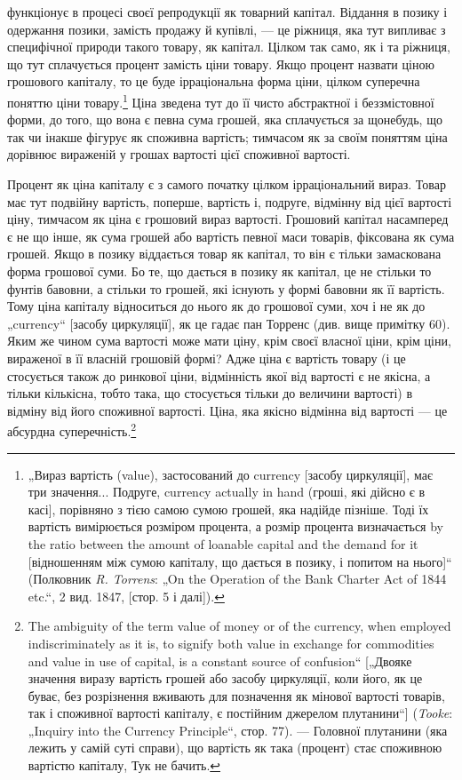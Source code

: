 \parcont{}  %
функціонує в процесі своєї репродукції як товарний капітал.
Віддання в позику і одержання позики, замість продажу й купівлі,
— це ріжниця, яка тут випливає з специфічної природи
такого товару, як капітал. Цілком так само, як і та ріжниця, що
тут сплачується процент замість ціни товару. Якщо процент
назвати ціною грошового капіталу, то це буде ірраціональна
форма ціни, цілком суперечна поняттю ціни товару.\footnote{„Вираз вартість (value), застосований до currency [засобу циркуляції], має
три значення... Подруге, currency actually in hand (гроші, які дійсно є в касі],
порівняно з тією самою сумою грошей, яка надійде пізніше. Тоді їх вартість
вимірюється розміром процента, а розмір процента визначається by the ratio
between the amount of loanable capital and the demand for it [відношенням між
сумою капіталу, що дається в позику, і попитом на нього]“ (Полковник
\emph{R. Torrens}: „On the Operation of the Bank Charter Act of 1844 etc.“, 2 вид. 1847,
[стор. 5 і далі]).} Ціна зведена
тут до її чисто абстрактної і беззмістовної форми, до того,
що вона є певна сума грошей, яка сплачується за щонебудь, що
так чи інакше фігурує як споживна вартість; тимчасом як за
своїм поняттям ціна дорівнює вираженій у грошах вартості цієї
споживної вартості.

Процент як ціна капіталу є з самого початку цілком ірраціональний
вираз. Товар має тут подвійну вартість, поперше, вартість
і, подруге, відмінну від цієї вартості ціну, тимчасом як ціна
є грошовий вираз вартості. Грошовий капітал насамперед є не
що інше, як сума грошей або вартість певної маси товарів, фіксована
як сума грошей. Якщо в позику віддається товар як
капітал, то він є тільки замаскована форма грошової суми. Бо
те, що дається в позику як капітал, це не стільки то фунтів
бавовни, а стільки то грошей, які існують у формі бавовни як
її вартість. Тому ціна капіталу відноситься до нього як до грошової
суми, хоч і не як до „currency“ [засобу циркуляції], як
це гадає пан Торренс (див. вище примітку 60). Яким же чином
сума вартості може мати ціну, крім своєї власної ціни, крім
ціни, вираженої в її власній грошовій формі? Адже ціна є вартість
товару (і це стосується також до ринкової ціни, відмінність
якої від вартості є не якісна, а тільки кількісна, тобто така, що
стосується тільки до величини вартості) в відміну від його
споживної вартості. Ціна, яка якісно відмінна від вартості —
це абсурдна суперечність.\footnote{
The ambiguity of the term value of money or of the currency, when employed
indiscriminately as it is, to signify both value in exchange for commodities
and value in use of capital, is a constant source of confusion“ [„Двояке значення
виразу вартість грошей або засобу циркуляції, коли його, як це буває, без
розрізнення вживають для позначення як мінової вартості товарів, так і споживної
вартості капіталу, є постійним джерелом плутанини“] (\emph{Tooke}: „Inquiry
into the Currency Principle“, стор. 77). — Головної плутанини (яка лежить у самій
суті справи), що вартість як така (процент) стає споживною вартістю капіталу,
Тук не бачить.
}

